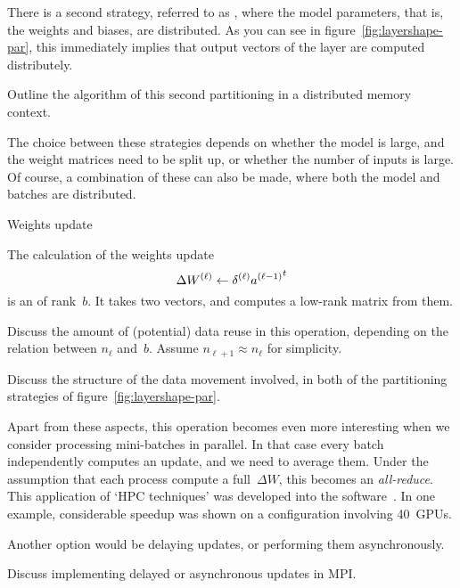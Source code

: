 There is a second strategy,
referred to as ,
where the model parameters,
that is, the weights and biases, are distributed.
As you can see in figure~\ref{fig:layershape-par},
this immediately implies that output vectors
of the layer are computed distributely.

\begin{exercise}
  Outline the algorithm of this second partitioning in a distributed memory context.
\end{exercise}

The choice between these strategies depends on whether the model is large,
and the weight matrices need to be split up,
or whether the number of inputs is large.
Of course, a combination of these can also be made,
where both the model and batches are distributed.

 {Weights update}

The calculation of the weights update
\[ \Delta W^{(\ell)} \leftarrow \delta^{(\ell)} {a^{(\ell-1)}}^t \]
is an  of rank~$b$.
It takes two vectors, and computes a low-rank matrix from them.

\begin{exercise}
  Discuss the amount of (potential) data reuse in this operation,
  depending on the relation between $n_\ell$ and~$b$.
  Assume $n_{\ell+1}\approx n_\ell$ for simplicity.
\end{exercise}

\begin{exercise}
  Discuss the structure of the data movement involved,
  in both of the partitioning strategies of figure~\ref{fig:layershape-par}.
\end{exercise}

Apart from these aspects, 
this operation becomes even more interesting
when we consider processing mini-batches in parallel.
In that case every batch independently computes an update,
and we need to average them.
Under the assumption that each process compute a full~$\Delta W$,
this becomes an \emph{all-reduce}.
This application of `HPC techniques' was developed
into the 
software~\cite{Gibiansky:baidu-allreduce,sergeev2018horovod,horovod-ai}.
In one example, considerable speedup was shown on a configuration involving
40~\acp{GPU}.

Another option would be delaying updates,
or performing them asynchronously.

\begin{exercise}
  Discuss implementing delayed or asynchronous updates in MPI.
\end{exercise}

